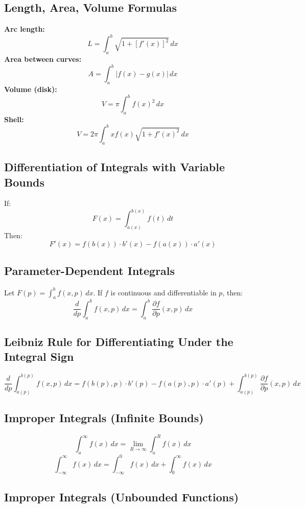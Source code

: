 \subsection{Length, Area, Volume Formulas}

\textbf{Arc length:}
\[
L = \int_a^b \sqrt{1 + [f'(x)]^2}\,dx
\]
\textbf{Area between curves:}
\[
A = \int_a^b |f(x) - g(x)|\,dx
\]
\textbf{Volume (disk):}
\[
V = \pi \int_a^b f(x)^2\,dx
\]
\textbf{Shell:}
\[
V = 2\pi \int_a^b x f(x) \sqrt{1 + f'(x)^2}\,dx
\]

\subsection{Differentiation of Integrals with Variable Bounds}

If:
\[
F(x) = \int_{a(x)}^{b(x)} f(t)\,dt
\]
Then:
\[
F'(x) = f(b(x)) \cdot b'(x) - f(a(x)) \cdot a'(x)
\]

\subsection{Parameter-Dependent Integrals}

Let \(F(p) = \int_a^b f(x, p)\,dx\). If \(f\) is continuous and differentiable in \(p\), then:
\[
\frac{d}{dp} \int_a^b f(x, p)\,dx = \int_a^b \frac{\partial f}{\partial p}(x, p)\,dx
\]

\subsection{Leibniz Rule for Differentiating Under the Integral Sign}

\[
\frac{d}{dp} \int_{a(p)}^{b(p)} f(x, p)\,dx = f(b(p), p) \cdot b'(p) - f(a(p), p) \cdot a'(p) + \int_{a(p)}^{b(p)} \frac{\partial f}{\partial p}(x, p)\,dx
\]

\subsection{Improper Integrals (Infinite Bounds)}

\[
\int_a^\infty f(x)\,dx = \lim_{R \to \infty} \int_a^R f(x)\,dx
\]
\[
\int_{-\infty}^\infty f(x)\,dx = \int_{-\infty}^0 f(x)\,dx + \int_0^\infty f(x)\,dx
\]

\subsection{Improper Integrals (Unbounded Functions)}

